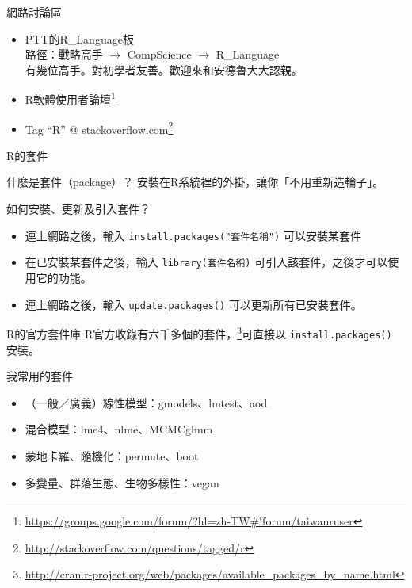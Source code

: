 \documentclass[14pt, aspectratio=43]{beamer}
\let\oldfootnote\footnote
\renewcommand\footnote[1]{\hspace{-0.7em}\oldfootnote{\ignorespaces#1}\hspace{0.5em}}
\begin{document}
\begin{frame}{網路討論區}
\begin{itemize}
\item PTT的R\_Language板 \\ 路徑：戰略高手 $\rightarrow$ CompScience $\rightarrow$ R\_Language\\ 有幾位高手。對初學者友善。歡迎來和安德魯大大認親。
\item R軟體使用者論壇\oldfootnote{\url{https://groups.google.com/forum/?hl=zh-TW\#!forum/taiwanruser}}
\item Tag ``R''  \makeatletter @ \makeatother stackoverflow.com\oldfootnote{\url{http://stackoverflow.com/questions/tagged/r}}
\end{itemize}
\end{frame}



\begin{frame}[fragile]{R的套件}
\begin{block}{什麼是套件（package）？}
安裝在R系統裡的外掛，讓你「不用重新造輪子」。
\end{block}

\begin{block}{如何安裝、更新及引入套件？}
\begin{itemize}
\item 連上網路之後，輸入 \verb+install.packages("套件名稱")+ 可以安裝某套件
\item 在已安裝某套件之後，輸入 \verb+library(套件名稱)+ 可引入該套件，之後才可以使用它的功能。
\item 連上網路之後，輸入 \verb+update.packages()+ 可以更新所有已安裝套件。
\end{itemize}
\end{block}

\end{frame}

\begin{frame}[fragile]{R的官方套件庫}
R官方收錄有六千多個的套件，\footnote{\url{http://cran.r-project.org/web/packages/available_packages_by_name.html}}可直接以 \verb+install.packages()+ 安裝。
\begin{block}{我常用的套件}
\begin{itemize}
\item （一般／廣義）線性模型：gmodels、lmtest、aod
\item 混合模型：lme4、nlme、MCMCglmm
\item 蒙地卡羅、隨機化：permute、boot
\item 多變量、群落生態、生物多樣性：vegan
\end{itemize}
\end{block}
\end{frame}
\end{document}
